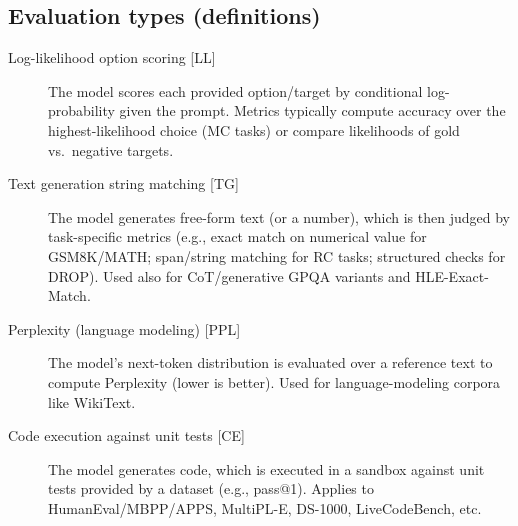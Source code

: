 \documentclass{article}
\begin{document}
\subsection*{Evaluation types (definitions)}
\begin{description}
  \item[Log-likelihood option scoring \textnormal{[LL]}] The model scores each provided option/target by conditional log-probability given the prompt. Metrics typically compute accuracy over the highest-likelihood choice (MC tasks) or compare likelihoods of gold vs.\ negative targets.
  \item[Text generation string matching \textnormal{[TG]}] The model generates free-form text (or a number), which is then judged by task-specific metrics (e.g., exact match on numerical value for GSM8K/MATH; span/string matching for RC tasks; structured checks for DROP). Used also for CoT/generative GPQA variants and HLE-Exact-Match.
  \item[Perplexity (language modeling) \textnormal{[PPL]}] The model’s next-token distribution is evaluated over a reference text to compute Perplexity (lower is better). Used for language-modeling corpora like WikiText.
  \item[Code execution against unit tests \textnormal{[CE]}] The model generates code, which is executed in a sandbox against unit tests provided by a dataset (e.g., pass@1). Applies to HumanEval/MBPP/APPS, MultiPL-E, DS-1000, LiveCodeBench, etc.
\end{description}



\newcommand{\LL}{[LL]}   %
\newcommand{\TG}{[TG]}   %
\newcommand{\PPL}{[PPL]} %
\newcommand{\CE}{[CE]}   %

\newcommand{\legendSquare}[1]{%
  \begingroup
  \setlength{\fboxsep}{0pt}%
  \fcolorbox{black!30}{#1}{\phantom{\rule{9pt}{9pt}}}%
  \endgroup
}
\end{document}

